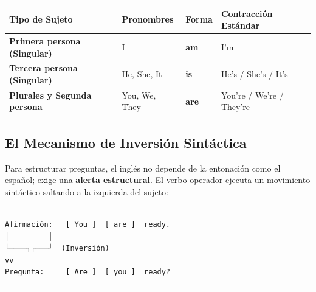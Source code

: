 \documentclass[
  spanish,
  letterpaper,
]{scrbook}
\begin{document}
\begin{longtable}[]{@{}
  >{\raggedright\arraybackslash}p{}
  >{\raggedright\arraybackslash}p{}
  >{\centering\arraybackslash}p{}
  >{\centering\arraybackslash}p{}@{}}
\toprule\noalign{}
\begin{minipage}[b]{\linewidth}\raggedright
Tipo de Sujeto
\end{minipage} & \begin{minipage}[b]{\linewidth}\raggedright
Pronombres
\end{minipage} & \begin{minipage}[b]{\linewidth}\centering
Forma
\end{minipage} & \begin{minipage}[b]{\linewidth}\centering
Contracción Estándar
\end{minipage} \\
\midrule\noalign{}
\endhead
\bottomrule\noalign{}
\endlastfoot
\textbf{Primera persona (Singular)} & I & \textbf{am} & I'm \\
\textbf{Tercera persona (Singular)} & He, She, It & \textbf{is} & He's /
She's / It's \\
\textbf{Plurales y Segunda persona} & You, We, They & \textbf{are} &
You're / We're / They're \\
\end{longtable}

\subsection{El Mecanismo de Inversión
Sintáctica}\label{el-mecanismo-de-inversiuxf3n-sintuxe1ctica}

Para estructurar preguntas, el inglés no depende de la entonación como
el español; exige una \textbf{alerta estructural}. El verbo operador
ejecuta un movimiento sintáctico saltando a la izquierda del sujeto:

\begin{verbatim}

Afirmación:   [ You ]  [ are ]  ready.
│         │
└────┐┌───┘  (Inversión)
vv
Pregunta:     [ Are ]  [ you ]  ready?
\end{verbatim}

\begin{center}\rule{0.5\linewidth}{0.5pt}\end{center}
\end{document}

